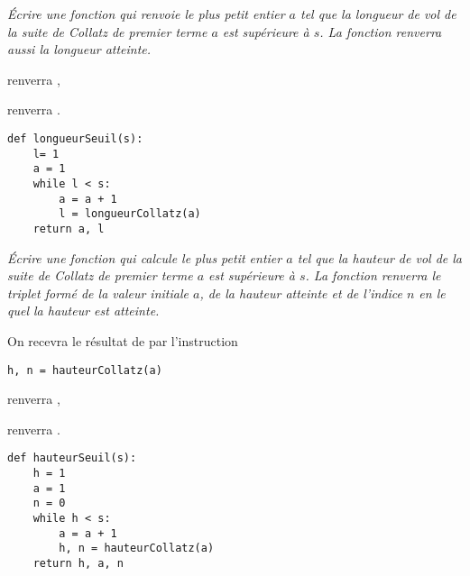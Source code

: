 \begin{Exercise}[title= Longueur à atteindre]\it
Écrire une fonction  qui renvoie le plus petit entier $a$ tel que la longueur de vol de la suite de Collatz de premier terme $a$ est supérieure à $s$. La fonction renverra aussi la longueur atteinte.

 renverra ,

 renverra .
\end{Exercise}
\begin{Answer} 
\begin{lstlisting}
def longueurSeuil(s):
    l= 1
    a = 1
    while l < s:
        a = a + 1
        l = longueurCollatz(a)
    return a, l
\end{lstlisting}
\end{Answer}
\begin{Exercise}[title= Hauteur à atteindre]\it
Écrire une fonction  qui calcule le plus petit entier $a$ tel que la hauteur de vol de la suite de Collatz de premier terme $a$ est supérieure à $s$. La fonction renverra le triplet formé de la valeur initiale $a$, de la hauteur atteinte et de l'indice $n$ en le quel la hauteur est atteinte.

On recevra le résultat de  par l'instruction
\begin{lstlisting}
h, n = hauteurCollatz(a)
\end{lstlisting}

 renverra ,

 renverra .
\end{Exercise}
\begin{Answer} 
\begin{lstlisting}
def hauteurSeuil(s):
    h = 1
    a = 1
    n = 0
    while h < s:
        a = a + 1
        h, n = hauteurCollatz(a)
    return h, a, n
\end{lstlisting}
\end{Answer}
